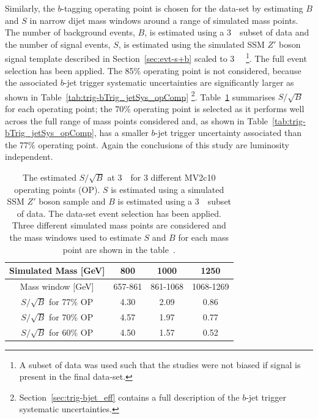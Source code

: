 Similarly, the $b$-tagging operating point is chosen for the \lm{} data-set
by estimating $B$ and $S$ in narrow dijet mass windows around a range of simulated mass points.
The number of background events, $B$, is estimated  using a
3~\ifb~subset of \lm{} data and 
the number of signal events, $S$, is estimated using the simulated SSM $Z'$ boson signal template
described in Section~\ref{sec:evt-s+b} scaled to 3~\ifb~
\footnote{A subset of data was used such that the studies were not biased if signal is present in the final data-set.}.
The full \lm{} event selection has been applied.
The 85\% operating point is not considered,
because the associated $b$-jet trigger systematic uncertainties
are significantly larger as shown in Table~\ref{tab:trig-bTrig_jetSys_opComp}
\footnote{Section~\ref{sec:trig-bjet_eff} contains a full description of the $b$-jet trigger systematic uncertainties.}.
Table~\ref{tab:evt-btag_lm} summarises $S/\sqrt{B}$ for each operating point;
the 70\% operating point is selected as it performs well across the full range of mass points considered
and, as shown in Table~\ref{tab:trig-bTrig_jetSys_opComp}, has a smaller $b$-jet trigger uncertainty associated than the 77\% operating point.
Again the conclusions of this study are luminosity independent.

\vspace{-0.4em}
\begin{table}[ht]
\begin{center}
\begin{tabular}{|c||c|c|c|}
  \hline
  Simulated Mass [GeV]            &   800       &  1000       & 1250\\
  \hline
  Mass window [GeV]               &  657-861    &  861-1068   & 1068-1269 \\
  \hline
  $S/\sqrt{B}$ for 77\% OP        &  4.30       &  2.09       & 0.86     \\
  $S/\sqrt{B}$ for 70\% OP        &  4.57       &  1.97       & 0.77     \\
  $S/\sqrt{B}$ for 60\% OP        &  4.50       &  1.57       & 0.52     \\
  \hline
\end{tabular}
\caption[The estimated $S/\sqrt{B}$ at 3~\ifb~for 3 different MV2c10 operating points (OP).
  $S$ is estimated using a simulated SSM $Z'$ boson sample and $B$ is estimated using a 3~\ifb~subset of data.
  The \lm{} data-set event selection has been applied.
  Three different simulated mass points are considered and the mass windows used
  to estimate $S$ and $B$ for each mass point are shown in the table.]
        {The estimated $S/\sqrt{B}$ at 3~\ifb~for 3 different MV2c10 operating points (OP).
          $S$ is estimated using a simulated SSM $Z'$ boson sample and $B$ is estimated using a 3~\ifb~subset of data.
          The \lm{} data-set event selection has been applied.
          Three different simulated mass points are considered and the mass windows used
          to estimate $S$ and $B$ for each mass point are shown in the table~\cite{dibjet-full_int}.}
\vspace{-2em}
\label{tab:evt-btag_lm}
\end{center}
\end{table}

